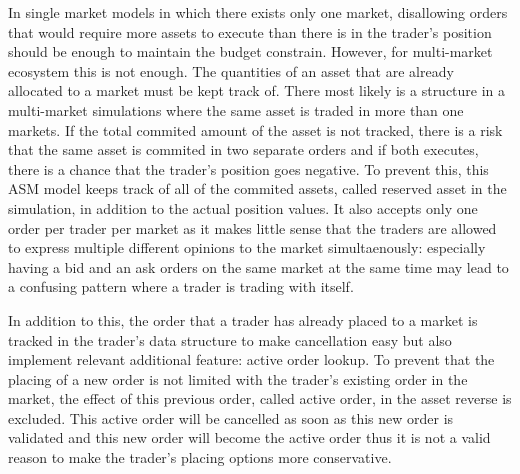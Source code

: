 In single market models in which there exists only one market, disallowing 
orders that would require more assets to execute
than there is in the trader's position should be enough to maintain the budget constrain. 
However, for multi-market ecosystem this is not enough. The quantities of an asset 
that are already allocated to a market must be kept track of. There most 
likely is a structure in a multi-market simulations where the same asset %
is traded in more than one markets. If the total commited amount of the 
asset is not tracked, there is a risk that the same asset is commited 
in two separate orders and if both executes, there is a chance that 
the trader's position goes negative. To prevent this, this ASM model 
keeps track of all of the commited assets, called reserved asset 
in the simulation, in addition to the actual position values. It also
accepts only one order per trader per market as it makes little sense that
the traders are allowed to express multiple different opinions to the market 
simultaenously: especially having a bid and an ask orders on the same market
at the same time may lead to a confusing pattern where a trader is trading with
itself. 

In addition to this, the order that a trader has already placed
to a market is tracked in the trader's data structure to make cancellation easy
but also implement relevant additional feature: active order lookup. To prevent that
the placing of a new order is not limited with the trader's existing order in the market,
the effect of this previous order, called active order, in the asset reverse is excluded. 
This active order will be cancelled as soon as this new order is validated and this new order
will become the active order thus it is not a valid reason to make the trader's placing 
options more conservative.

